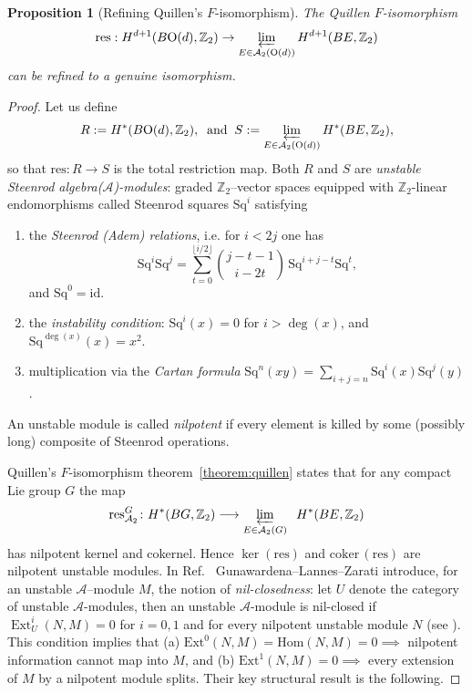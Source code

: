 \documentclass[aps,prx,reprint,superscriptaddress,twocolumn,amsmath,amssymb,amsfonts, nofootinbib]{revtex4-2}
\newcommand{\Sq}{\text{Sq}}
\newcommand{\qa}{\mathcal{A}_{2}}
\newcommand{\res}{\text{res}}
\newcommand{\Z}{\mathbb{Z}}
\theoremstyle{apsstyle}
\newtheorem{proposition}[theorem]{Proposition}
\begin{document}
\begin{proposition}[Refining Quillen's $F$-isomorphism]
\label{prop:quillen_mod2_isom}
The Quillen $F$-isomorphism
\begin{equation*}
     \res: H^{d+1}(B\mathrm{O}(d), \mathbb{Z}_{2}) \to \varprojlim_{E\in \qa(\mathrm{O}(d))} H^{d+1}(BE, \mathbb{Z}_{2}) 
\end{equation*}
\noindent can be refined to a \textit{genuine} isomorphism.
\end{proposition}
\begin{proof}
Let us define
\begin{equation*}
R:=H^{*}(B\mathrm{O}(d),\mathbb Z_{2}),\;\;  \text{and}\;\; 
S:=\displaystyle\varprojlim_{E\in \qa(\mathrm{O}(d))}H^{*}(BE,\mathbb Z_{2}),
\end{equation*}so that $\res\colon R\to S$ is the total restriction map.
Both $R$ and $S$ are \emph{unstable Steenrod algebra($\mathcal{A}$)-modules}: graded
$\mathbb Z_{2}$–vector spaces equipped with $\Z_{2}$-linear endomorphisms called Steenrod squares $\mathrm{Sq}^{i}$ satisfying 
\begin{enumerate}
    \item the \emph{Steenrod (Adem) relations}, i.e. for $i<2j$ one has
    \begin{equation*}
\Sq^{i}\Sq^{j}
=\sum_{t=0}^{\lfloor i/2\rfloor}
\binom{j-t-1}{i-2t}\,\Sq^{i+j-t}\Sq^{t},
\end{equation*} and $\Sq^{0}=\mathrm{id}$.
    \item the \emph{instability condition}: $\Sq^{i}(x)=0$ for $i>\deg(x)$, and $\Sq^{\deg(x)}(x)=x^{2}$.
    \item multiplication via the \emph{Cartan formula}
$\Sq^{n}(xy)=\sum_{i+j=n}\Sq^{i}(x)\Sq^{j}(y)$.
\end{enumerate}
An unstable module is called \emph{nilpotent} if every element is killed
by some (possibly long) composite of Steenrod operations.

\medskip

Quillen’s $F$-isomorphism theorem~\ref{theorem:quillen} states that for any compact Lie group $G$ the map
\begin{equation*}
\res^{G}_{\mathcal{A}_{2}}\colon H^{*}(BG, \Z_{2})\longrightarrow\varprojlim_{E\in \mathcal{A}_{2}(G)}\;\; H^{*}(BE, \Z_{2})
\end{equation*}
has nilpotent kernel and cokernel.  Hence $\ker (\res)$ and
$\mathrm{coker}\,(\res)$ are nilpotent unstable modules. In Ref.~\cite{GLZ} Gunawardena–Lannes–Zarati introduce, for an unstable $\mathcal{A}$–module $M$, the notion of \emph{nil-closedness}: let $U$ denote the category of unstable $\mathcal{A}$-modules, then an unstable $\mathcal{A}$-module is nil-closed if  $\operatorname{Ext}^{i}_{U}(N,M)=0$ for $i=0,1$ and for every nilpotent unstable module $N$ (see \cite[§2]{GLZ}). This condition implies that (a) $\mathrm{Ext}^{0}(N,M)= \mathrm{Hom}(N, M) = 0 \implies $ nilpotent information cannot map into $M$, and (b) $\mathrm{Ext}^{1}(N,M)=0\implies $ every extension of $M$ by a nilpotent module splits. Their key structural result is the following.


\end{proof}
\end{document}
